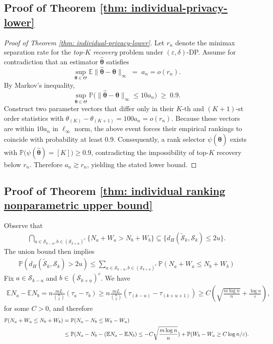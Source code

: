 \documentclass[letterpaper,12pt]{article}
\numberwithin{equation}{section}
\theoremstyle{plain}
\numberwithin{Theorem}{section}
\numberwithin{corollary}{section}
\numberwithin{proposition}{section}
\numberwithin{Lemma}{section}
{
	\theoremstyle{definition}
	\newtheorem{Definition}{Definition}
	\newtheorem{example}{Example}
	\numberwithin{example}{section}
	\newtheorem{fact}{Fact}
	\numberwithin{fact}{section}
	\newtheorem{remark}{Remark}
}
\newcommand{\Pro}{\mathbb{P}}
\newcommand{\1}{\mathbbm{1}}
\def\bth{{\boldsymbol{\theta}}}
\def\Pr{\mathbb P}
\def\E{\mathbb{E}}
\begin{document}
\subsection{Proof of Theorem \ref{thm: individual-privacy-lower}}
\begin{proof}[Proof of Theorem \ref{thm: individual-privacy-lower}]
	 Let \(r_{n}\) denote the minimax separation rate for the
	\emph{top-\(K\) recovery} problem under \((\varepsilon,\delta)\)-DP.
	Assume for contradiction that an estimator \(\hat\bth\) satisfies
	\[
	\sup_{\bth\in\Theta}
	\mathbb{E}\|\hat\bth-\bth\|_\infty
	\;=\;
	a_{n}
	= o(r_{n}).
	\]
	By Markov's inequality,
	\[
	\sup_{\bth\in\Theta}
	\Pr\bigl(\|\hat\bth-\bth\|_\infty \le 10a_{n}\bigr)
	\;\ge\; 0.9.
	\]
	Construct two parameter vectors that differ only in their
	\(K\)-th and \((K+1)\)-st order statistics with
	\(\theta_{(K)}-\theta_{(K+1)} = 100a_{n} = o(r_{n})\).
	Because these vectors are within \(10a_{n}\) in \(\ell_\infty\) norm,
	the above event forces their empirical rankings to coincide with
	probability at least \(0.9\).
	Consequently, a rank selector \(\psi(\hat\bth)\) exists with
	\(\Pr\bigl(\psi(\hat\bth)=[K]\bigr)\ge 0.9\),
	contradicting the impossibility of top-\(K\) recovery below \(r_{n}\).
	Therefore \(a_{n}\gtrsim r_{n}\), yielding the stated lower bound.
\end{proof}	


\subsection{Proof of Theorem \ref{thm: individual ranking nonparametric upper bound}}
\label{sec: proof of thm: individual ranking nonparametric upper bound}

Observe that 
\begin{align*}
	\bigcap_{a \in \mathcal S_{k-u}, b \in (\mathcal S_{k+u})^c }\{N_a + W_a > N_b + W_b\} \subseteq \{d_H(\widetilde {\mathcal S}_k, \mathcal S_k) \leq  2u\}.
\end{align*}
The union bound then implies
\begin{align}
	\Pro(d_H(\widetilde {\mathcal S}_k, \mathcal S_k) >  2u) \leq \sum_{a \in \mathcal S_{k-u}, b \in (\mathcal S_{k+u})^c} \Pro(N_a + W_a \leq N_b + W_b) \label{eq: individual ranking nonparametric upper bound expansion 1}
\end{align}
Fix $a \in \mathcal S_{k-u}$ and $b \in (\mathcal S_{k+u})^c$. We have 
\begin{align*}
	\E N_a - \E N_b = n\frac{mL}{{n \choose 2}}(\tau_a - \tau_b) \geq  n\frac{mL}{{n \choose 2}}(\tau_{(k-u)} - \tau_{(k+u+1)}) \geq C\left(\sqrt{\frac{m\log n}{n}} + \frac{\log n}{\varepsilon}\right),
\end{align*}
for some $C > 0$, and therefore
\begin{align}
	\Pro(N_a + W_a \leq N_b + W_b) &= \Pro(N_a - N_b \leq W_b - W_a) \notag\\
	&\leq \Pro(N_a - N_b - (\E N_a - \E N_b) \leq -C\sqrt{\frac{m \log n}{n}}) + \Pro(W_b-W_a \geq C\log n/\varepsilon) \label{eq: individual ranking nonparametric upper bound expansion 2}.
\end{align}
\end{document}
